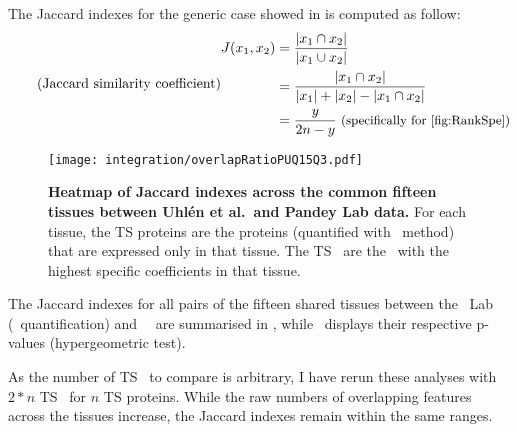 \begin{minipage}{\textwidth}
    The Jaccard indexes for the generic case showed in 
    is computed as follow:
\begin{equation}
    \tag{Jaccard similarity coefficient}\label{eq:Jaccard}
    \begin{split}
        J(x_{1},x_{2}) & = \frac{\left | x_{1}\cap  x_{2}\right |}%
                                {\left | x_{1}\cup  x_{2}\right |}\\
                       & = \frac{\left | x_{1}\cap  x_{2}\right |}%
                                {\left | x_{1} \right | + \left | x_{2} \right |%
                                - \left | x_{1}\cap  x_{2}\right |}\\
                                & = \frac{y}{2n-y} \text{\small{~(specifically
                                for~\Cref{fig:RankSpe})}}\\
    \end{split}
    \raisetag{6cm}
\end{equation}
\end{minipage}


\begin{figure}[!htb]
    \texttt{[image: integration/overlapRatioPUQ15Q3.pdf]}\centering
    \vspace{-2mm}
\caption[Heatmap of Jaccard indexes across 15 tissues]{%
\label{fig:JaccardIndexes}\label{fig:RatioJac}\textbf{Heatmap of Jaccard indexes
across the common fifteen tissues between Uhlén et al.\ and Pandey Lab data.}
For each tissue, the \gls{TS} proteins are the proteins
(quantified with \PPKM\ method) that are expressed only in that tissue.
The \gls{TS} \mRNAs\ are the \mRNAs\ with the highest specific coefficients
in that tissue.}
\vspace{-4mm}
\end{figure}

The Jaccard indexes for all pairs of the fifteen shared tissues
between the \pandey\ Lab (\PPKM\ quantification) and \uhlen\ \etal\
are summarised in ,
while~ displays
their respective p-values (hypergeometric test).\\
\vspace{-\baselineskip}


As the number of \gls{TS} \mRNAs\ to compare is arbitrary,
I have rerun these analyses with $2*n$ \gls{TS} \mRNAs\ for $n$ \gls{TS} proteins.
While the raw numbers of overlapping features across the tissues increase,
the Jaccard indexes remain within the same ranges.

